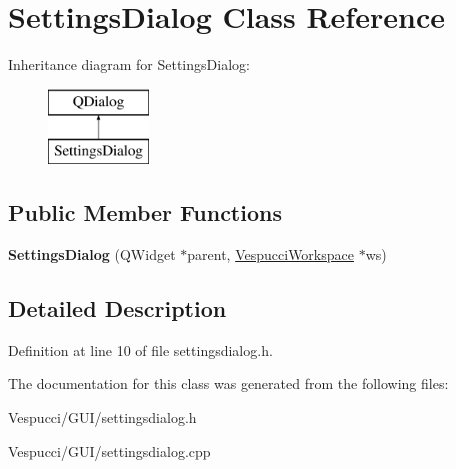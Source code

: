\hypertarget{class_settings_dialog}{}\section{Settings\+Dialog Class Reference}
\label{class_settings_dialog}
Inheritance diagram for Settings\+Dialog\+:\begin{figure}[H]
\begin{center}
\leavevmode
\includegraphics[height=2.000000cm]{class_settings_dialog}
\end{center}
\end{figure}
\subsection*{Public Member Functions}
\begin{DoxyCompactItemize}
\item 
{\bfseries Settings\+Dialog} (Q\+Widget $\ast$parent, \hyperlink{class_vespucci_workspace}{Vespucci\+Workspace} $\ast$ws)\hypertarget{class_settings_dialog_a45120e2aed80de31f61b11957367224c}{}\label{class_settings_dialog_a45120e2aed80de31f61b11957367224c}

\end{DoxyCompactItemize}


\subsection{Detailed Description}


Definition at line 10 of file settingsdialog.\+h.



The documentation for this class was generated from the following files\+:\begin{DoxyCompactItemize}
\item 
Vespucci/\+G\+U\+I/settingsdialog.\+h\item 
Vespucci/\+G\+U\+I/settingsdialog.\+cpp\end{DoxyCompactItemize}
